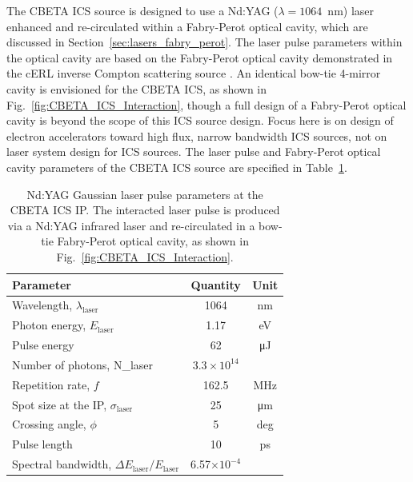 \documentclass[../main.tex]{subfiles}
\begin{document}
The CBETA ICS source is designed to use a Nd:YAG ($\lambda=1064$~\si{\nano\meter}) laser enhanced and re-circulated within a Fabry-Perot optical cavity, which are discussed in Section~\ref{sec:lasers_fabry_perot}. The laser pulse parameters within the optical cavity are based on the Fabry-Perot optical cavity demonstrated in the cERL inverse Compton scattering source \cite{akagi2016narrow}. An identical bow-tie 4-mirror cavity is envisioned for the CBETA ICS, as shown in Fig.~\ref{fig:CBETA_ICS_Interaction}, though a full design of a Fabry-Perot optical cavity is beyond the scope of this ICS source design. Focus here is on design of electron accelerators toward high flux, narrow bandwidth ICS sources, not on laser system design for ICS sources. The laser pulse and Fabry-Perot optical cavity parameters of the CBETA ICS source are specified in Table~\ref{tab:CBETA_laser_pulse_design_parameters}. 
\begin{table}[!h]
\centering
\caption{Nd:YAG Gaussian laser pulse parameters at the CBETA ICS IP. The interacted laser pulse is produced via a Nd:YAG infrared laser and re-circulated in a bow-tie Fabry-Perot optical cavity, as shown in Fig.~\ref{fig:CBETA_ICS_Interaction}.}
\vspace{3mm}
\begin{tabular}{lcc}
\hline\hline
Parameter & Quantity & Unit \\
\hline
Wavelength, $\lambda_\textrm{laser}$ & 1064 & \si{\nano\meter}\\
Photon energy, $E_\textrm{laser}$ & 1.17 & \si{\electronvolt}\\
Pulse energy  & 62 & \si{\micro\joule}\\
Number of photons, N_{\textrm{laser}} & $3.3\times 10^{14}$\\ 
Repetition rate, $f$ & 162.5 & \si{\mega\hertz}\\
Spot size at the IP, $\sigma_\textrm{laser}$ & 25 & \si{\micro\meter}\\
Crossing angle, $\phi$ & 5 & deg \\
Pulse length  & 10 & \si{\pico\second}\\
Spectral bandwidth, $\Delta E_\textrm{laser}/E_\textrm{laser}$ & 6.57$\times 10^{-4}$ &   \\
\hline\hline
\end{tabular}
\label{tab:CBETA_laser_pulse_design_parameters}
\end{table}
\end{document}
